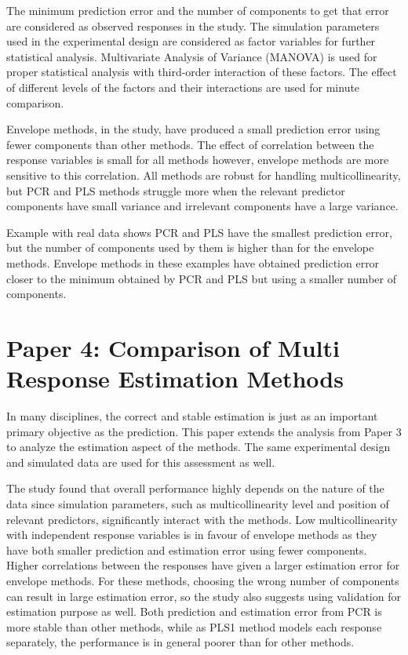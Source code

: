 \documentclass[11pt,twoside,openright,titlepage,
  headinclude,footinclude,BCOR=5mm,
  numbers=noenddot,cleardoublepage=empty,
  tablecaptionabove, dottedtoc,
  bibliography=totoc,paper=a4]{scrreprt}
\begin{document}
The minimum prediction error and the number of components to get that error are considered as observed responses in the study. The simulation parameters used in the experimental design are considered as factor variables for further statistical analysis. Multivariate Analysis of Variance (MANOVA) is used for proper statistical analysis with third-order interaction of these factors. The effect of different levels of the factors and their interactions are used for minute comparison.

Envelope methods, in the study, have produced a small prediction error using fewer components than other methods. The effect of correlation between the response variables is small for all methods however, envelope methods are more sensitive to this correlation. All methods are robust for handling multicollinearity, but PCR and PLS methods struggle more when the relevant predictor components have small variance and irrelevant components have a large variance.

Example with real data shows PCR and PLS have the smallest prediction error, but the number of components used by them is higher than for the envelope methods. Envelope methods in these examples have obtained prediction error closer to the minimum obtained by PCR and PLS but using a smaller number of components.

\hypertarget{paper-4-comparison-of-multi-response-estimation-methods}{%
\section{Paper 4: Comparison of Multi Response Estimation Methods}\label{paper-4-comparison-of-multi-response-estimation-methods}}

In many disciplines, the correct and stable estimation is just as an important primary objective as the prediction. This paper extends the analysis from Paper 3 to analyze the estimation aspect of the methods. The same experimental design and simulated data are used for this assessment as well.

The study found that overall performance highly depends on the nature of the data since simulation parameters, such as multicollinearity level and position of relevant predictors, significantly interact with the methods. Low multicollinearity with independent response variables is in favour of envelope methods as they have both smaller prediction and estimation error using fewer components. Higher correlations between the responses have given a larger estimation error for envelope methods. For these methods, choosing the wrong number of components can result in large estimation error, so the study also suggests using validation for estimation purpose as well. Both prediction and estimation error from PCR is more stable than other methods, while as PLS1 method models each response separately, the performance is in general poorer than for other methods.
\end{document}

